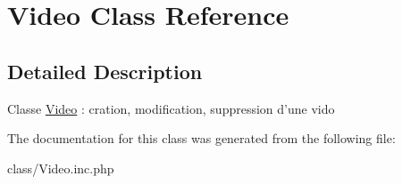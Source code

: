 \hypertarget{class_video}{
\section{Video Class Reference}
\label{class_video}
}


\subsection{Detailed Description}
Classe \hyperlink{class_video}{Video} : cration, modification, suppression d'une vido 

The documentation for this class was generated from the following file:\begin{DoxyCompactItemize}
\item 
class/Video.inc.php\end{DoxyCompactItemize}
